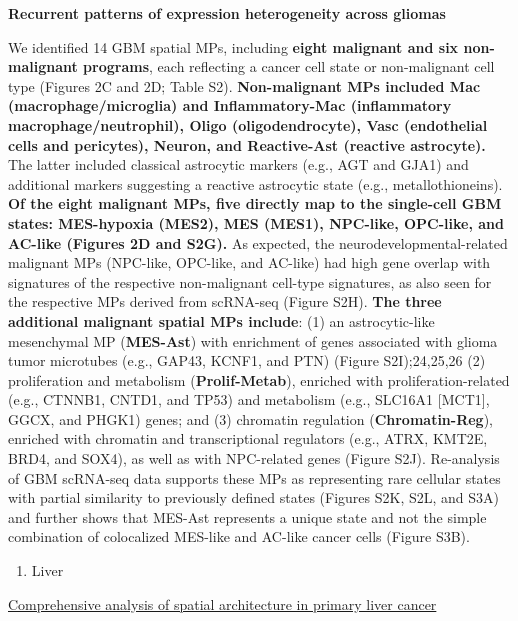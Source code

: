\documentclass[
]{book}
\providecommand{\tightlist}{%
  \setlength{\itemsep}{0pt}\setlength{\parskip}{0pt}}
\begin{document}
\textbf{Recurrent patterns of expression heterogeneity across gliomas}

We identified 14 GBM spatial MPs, including \textbf{eight malignant and six non-malignant programs}, each reflecting a cancer cell state or non-malignant cell type (Figures 2C and 2D; Table S2). \textbf{Non-malignant MPs included Mac (macrophage/microglia) and Inflammatory-Mac (inflammatory macrophage/neutrophil), Oligo (oligodendrocyte), Vasc (endothelial cells and pericytes), Neuron, and Reactive-Ast (reactive astrocyte).} The latter included classical astrocytic markers (e.g., AGT and GJA1) and additional markers suggesting a reactive astrocytic state (e.g., metallothioneins). \textbf{Of the eight malignant MPs, five directly map to the single-cell GBM states: MES-hypoxia (MES2), MES (MES1), NPC-like, OPC-like, and AC-like (Figures 2D and S2G). }As expected, the neurodevelopmental-related malignant MPs (NPC-like, OPC-like, and AC-like) had high gene overlap with signatures of the respective non-malignant cell-type signatures, as also seen for the respective MPs derived from scRNA-seq (Figure S2H).
\textbf{The three additional malignant spatial MPs include}: (1) an astrocytic-like mesenchymal MP (\textbf{MES-Ast}) with enrichment of genes associated with glioma tumor microtubes (e.g., GAP43, KCNF1, and PTN) (Figure S2I);24,25,26 (2) proliferation and metabolism (\textbf{Prolif-Metab}), enriched with proliferation-related (e.g., CTNNB1, CNTD1, and TP53) and metabolism (e.g., SLC16A1 {[}MCT1{]}, GGCX, and PHGK1) genes; and (3) chromatin regulation (\textbf{Chromatin-Reg}), enriched with chromatin and transcriptional regulators (e.g., ATRX, KMT2E, BRD4, and SOX4), as well as with NPC-related genes (Figure S2J). Re-analysis of GBM scRNA-seq data supports these MPs as representing rare cellular states with partial similarity to previously defined states (Figures S2K, S2L, and S3A) and further shows that MES-Ast represents a unique state and not the simple combination of colocalized MES-like and AC-like cancer cells (Figure S3B).

\begin{enumerate}
\def\labelenumi{\arabic{enumi}.}
\setcounter{enumi}{3}
\tightlist
\item
  Liver
\end{enumerate}

\href{https://www.science.org/doi/10.1126/sciadv.abg3750}{Comprehensive analysis of spatial architecture in primary liver cancer}
\end{document}
